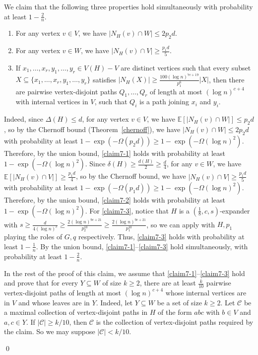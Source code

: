 \documentclass[10pt]{article}
\theoremstyle{plain}
\numberwithin{theorem}{section}
\theoremstyle{definition}
\theoremstyle{remark}
\renewenvironment{proof}[1][]{\begin{trivlist}
\item[\hspace{\labelsep}{\bf\noindent Proof#1.\/}] }{\qed\end{trivlist}}
\renewcommand{\setminus}{-}
\theoremstyle{plain}
\begin{document}
	\begin{proof}[ of claim]
		We claim that the following three properties hold simultaneously with probability at least $1 - \frac{2}{n}$.
		\begin{enumerate}[label=(SP\arabic*)]
			\item \label{claim7-1}
				For any vertex $v \in V$, we have $|N_H(v) \cap W| \le 2 p_2 d$.
			\item \label{claim7-2}
				For any vertex $v \in W$, we have $|N_H(v) \cap V| \ge \frac{p_1 d}{5}$.
			\item \label{claim7-3}
				If $x_1, \ldots, x_r, y_1, \ldots, y_r \in V(H) \setminus V$ are distinct vertices such that every subset $X \subseteq \{x_1, \ldots, x_r, y_1, \ldots, y_r\}$ satisfies $|N_H(X)| \ge \frac{100 (\log n)^{7c+19}}{p_1^6} |X|$, then there are pairwise vertex-disjoint paths $Q_1, \ldots, Q_r$ of length at most $(\log n)^{c+4}$ with internal vertices in $V$, such that $Q_i$ is a path joining $x_i$ and $y_i$.
		\end{enumerate}
		Indeed, since $\Delta(H) \le d$, for any vertex $v \in V$, we have $\mathbb{E}[|N_H(v) \cap W|] \le p_2 d$, so by the Chernoff bound (Theorem~\ref{chernoff}), we have $|N_H(v) \cap W| \le 2 p_2 d$ with probability at least $1 - \exp(-\Omega(p_2d)) \ge 1 - \exp(-\Omega(\log n)^2)$. Therefore, by the union bound, \ref{claim7-1} holds with probability at least $1 - \exp(-\Omega(\log n)^2)$.
		Since $\delta(H) \ge \frac{d(H)}{2} \ge \frac{d}{4}$, for any $v \in W$, we have $\mathbb{E}[|N_H(v) \cap V|] \ge \frac{p_1 d}{4}$, so by the Chernoff bound, we have $|N_H(v) \cap V| \ge \frac{p_1 d}{5}$ with probability at least $1 - \exp(-\Omega(p_1d)) \ge 1 - \exp(-\Omega(\log n)^2)$. Therefore, by the union bound, \ref{claim7-2} holds with probability at least $1 - \exp(-\Omega(\log n)^2)$.
		For \ref{claim7-3}, notice that $H$ is a $(\frac{1}{8}, c, s)$-expander with $s \ge \frac{d}{4 (\log n)^c} \ge \frac{2 (\log n)^{9c+21}}{p_2^{10}} \ge \frac{2 (\log n)^{9c+21}}{p_1^{10}}$, so we can apply  with $H, p_1$ playing the roles of $G, q$ respectively. Thus, \ref{claim7-3} holds with probability at least $1 - \frac{1}{n}$.
		By the union bound, \ref{claim7-1}--\ref{claim7-3} hold simultaneously, with probability at least $1 - \frac{2}{n}$.

		In the rest of the proof of this claim, we assume that \ref{claim7-1}--\ref{claim7-3} hold and prove that for every $Y \subseteq W$ of size $k \ge 2$, there are at least $\frac{k}{10}$ pairwise vertex-disjoint paths of length at most $(\log n)^{c+4}$ whose internal vertices are in $V$ and whose leaves are in $Y$. Indeed, let $Y \subseteq W$ be a set of size $k \ge 2$.
		Let $\mathcal{C}$ be a maximal collection of vertex-disjoint paths in $H$ of the form $abc$ with $b \in V$ and $a, c \in Y$. If $|\mathcal C| \ge k/10$, then $\mathcal{C}$ is the collection of vertex-disjoint paths required by the claim. So we may suppose $|\mathcal C| < k/10$. 


\end{proof}
\end{document}
